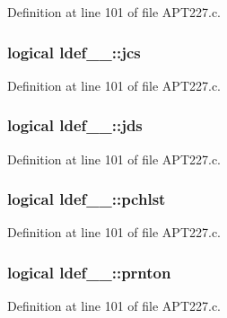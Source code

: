 Definition at line 101 of file A\+P\+T227.\+c.

\subsubsection[{\texorpdfstring{jcs}{jcs}}]{\setlength{\rightskip}{0pt plus 5cm}logical ldef\+\_\+\_\+\+::jcs}\hypertarget{structldef__1___ab11a592fc4ff99daaba09d08102f2093}{}\label{structldef__1___ab11a592fc4ff99daaba09d08102f2093}


Definition at line 101 of file A\+P\+T227.\+c.

\subsubsection[{\texorpdfstring{jds}{jds}}]{\setlength{\rightskip}{0pt plus 5cm}logical ldef\+\_\+\_\+\+::jds}\hypertarget{structldef__1___aff9475dcd7f6611f39f142eee1f12283}{}\label{structldef__1___aff9475dcd7f6611f39f142eee1f12283}


Definition at line 101 of file A\+P\+T227.\+c.

\subsubsection[{\texorpdfstring{pchlst}{pchlst}}]{\setlength{\rightskip}{0pt plus 5cm}logical ldef\+\_\+\_\+\+::pchlst}\hypertarget{structldef__1___a0d6a50d2a4cebdd1690abed362b7de17}{}\label{structldef__1___a0d6a50d2a4cebdd1690abed362b7de17}


Definition at line 101 of file A\+P\+T227.\+c.

\subsubsection[{\texorpdfstring{prnton}{prnton}}]{\setlength{\rightskip}{0pt plus 5cm}logical ldef\+\_\+\_\+\+::prnton}\hypertarget{structldef__1___ab875319657e6ab84536f363db335ca41}{}\label{structldef__1___ab875319657e6ab84536f363db335ca41}


Definition at line 101 of file A\+P\+T227.\+c.

